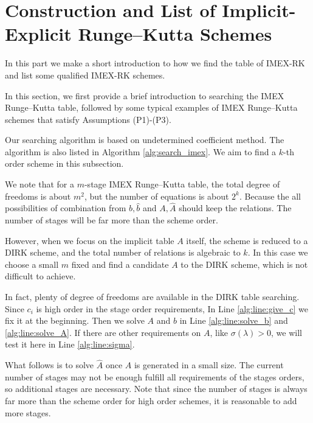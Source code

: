 \documentclass[a4paper, oneside]{book}
\def\hatA{{\hat{A}}}
\def\hatb{{\hat{b}}}
\begin{document}



\section{Construction and List of Implicit-Explicit Runge--Kutta Schemes}\label{sec:imex-list}

In this part we make a short introduction to how we find the table of IMEX-RK and list some qualified IMEX-RK schemes. 

 In this section, we first provide a brief introduction to searching the IMEX Runge--Kutta table, followed by some typical examples of IMEX Runge--Kutta schemes that satisfy Assumptions (P1)-(P3).


Our searching algorithm is based on undetermined coefficient method. 
The algorithm is also listed in Algorithm \ref{alg:search_imex}.
We aim to find a $k$-th order scheme in this subsection.

We note that for a $m$-stage IMEX Runge--Kutta table, the total degree of freedoms is about $m^2$,
but the number of equations is about $2^k$.
Because the all possibilities of combination from $b, \hatb$ 
and $A, \hatA$ should keep the relations. 
The number of stages will be far more than the scheme order.

However, when we focus on the implicit table $A$ itself, 
the scheme is reduced to a DIRK scheme, and the total number 
of relations is algebraic to $k$. In this case we choose 
a small $m$ fixed and find a candidate $A$ to the DIRK scheme, 
which is not difficult to achieve. 

In fact, plenty of degree of freedoms are available in the DIRK 
table searching. Since $c_i$ is high order in the stage order 
requirements, In Line \ref{alg:line:give_c} we fix it at the beginning. 
Then we solve $A$ and $b$ in Line \ref{alg:line:solve_b} and \ref{alg:line:solve_A}.
If there are other requirements on $A$, like $\sigma(\lambda)>0$, 
we will test it here in Line \ref{alg:line:sigma}. 

What follows is to solve $\hatA$ once $A$ is generated in a small size.
The current number of stages may not be enough fulfill all requirements 
of the stages orders, so additional stages are necessary.
Note that since the number of stages is always far more than the scheme 
order for high order schemes, it is reasonable to add more stages. 
\end{document}

